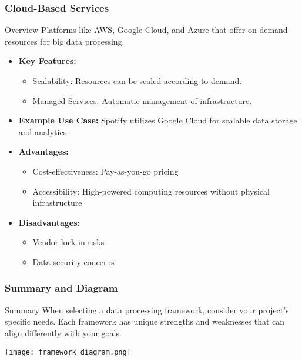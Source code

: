 \documentclass[aspectratio=169]{beamer}
\begin{document}
\begin{frame}[fragile]
    \frametitle{Cloud-Based Services}
    \begin{block}{Overview}
        Platforms like AWS, Google Cloud, and Azure that offer on-demand resources for big data processing.
    \end{block}
    \begin{itemize}
        \item \textbf{Key Features:}
            \begin{itemize}
                \item Scalability: Resources can be scaled according to demand.
                \item Managed Services: Automatic management of infrastructure.
            \end{itemize}
        \item \textbf{Example Use Case:}
            Spotify utilizes Google Cloud for scalable data storage and analytics.
        \item \textbf{Advantages:}
            \begin{itemize}
                \item Cost-effectiveness: Pay-as-you-go pricing
                \item Accessibility: High-powered computing resources without physical infrastructure
            \end{itemize}
        \item \textbf{Disadvantages:}
            \begin{itemize}
                \item Vendor lock-in risks
                \item Data security concerns
            \end{itemize}
    \end{itemize}
\end{frame}

\begin{frame}[fragile]
    \frametitle{Summary and Diagram}
    \begin{block}{Summary}
        When selecting a data processing framework, consider your project's specific needs. Each framework has unique strengths and weaknesses that can align differently with your goals.
    \end{block}
    \begin{center}
        \texttt{[image: framework\_diagram.png]}
    \end{center}
\end{frame}
\end{document}
